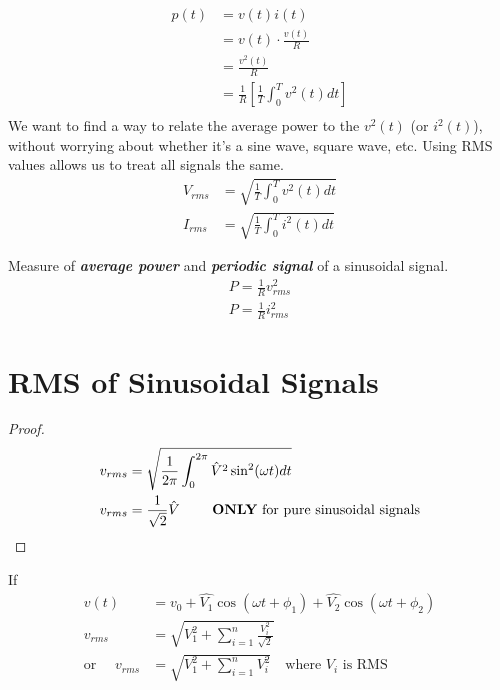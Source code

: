 \begin{theorem}
    \begin{align}
        p(t) & = v(t)i(t)                                       \\
             & = v(t) \cdot \frac{v(t)}{R}                      \\
             & = \frac{v^{2}(t)}{R}                             \\
             & = \frac{1}{R}[\frac{1}{T}\int_{0}^{T}v^{2}(t)dt] \\
    \end{align}
    We want to find a way to relate the average power to the $v^2(t)$ (or $i^2(t)$), without worrying about whether it's a sine wave, square wave, etc. Using RMS values allows us to treat all signals the same.
    \begin{align}
        V_{rms} & = \sqrt{\frac{1}{T}\int_{0}^{T}v^{2}(t)dt} \\
        I_{rms} & = \sqrt{\frac{1}{T}\int_{0}^{T}i^{2}(t)dt}
    \end{align}
\end{theorem}

\begin{definition}
    Measure of \textit{\textbf{average power}} and \textit{\textbf{periodic signal}} of a sinusoidal signal.
    \begin{align}
        P = \frac{1}{R}v_{rms}^{2} \\
        P = \frac{1}{R}i_{rms}^{2}
    \end{align}
\end{definition}

\section{RMS of Sinusoidal Signals}

\begin{proof}
    \begin{align}
        v_{rms} & = \sqrt{\frac{1}{2\pi}\int_{0}^{2\pi}\hat{V}^{2}\sin^{2}(\omega t)dt}                \\
        v_{rms} & = \frac{1}{\sqrt{2}}\hat{V} \qquad \text{ \textbf{ONLY} for pure sinusoidal signals}
    \end{align}
\end{proof}

\begin{example}
    If
    \begin{align}
        v(t)                     & = v_0 + \hat{V_1}\cos{(\omega t + \phi_1)} + \hat{V_2}\cos{(\omega t + \phi_2)} \\
        v_{rms}                  & = \sqrt{V_1^2 + \sum_{i=1}^{n}\frac{V_i^2}{\sqrt{2}}}                           \\
        \text{or } \quad v_{rms} & = \sqrt{V_1^2 + \sum_{i=1}^{n}V_i^2} \quad \text{where $V_i$ is RMS}
    \end{align}
\end{example}

